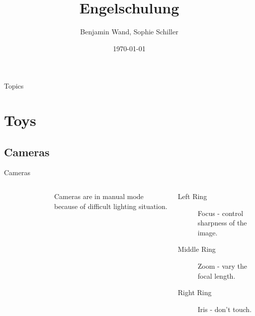 \documentclass[hyperref={pdfpagelabels=false}]{beamer}
\title{Engelschulung}    %
\author{Benjamin Wand, Sophie Schiller}
\date{\today}
\begin{document}
\begin{frame}
\titlepage
\end{frame} 

\begin{frame}{Topics}  %
\tableofcontents
\end{frame} 

\section{Toys}  %
\subsection{Cameras}
\begin{frame}{Cameras}
	\begin{columns}[T,onlytextwidth]
	\begin{figure} 
		\centering
		\def\svgwidth{0.9\textwidth}
		
	\end{figure}
	Cameras are in manual mode because of difficult lighting situation.
	\begin{description}
		\item[Left Ring] Focus - control sharpness of the image.
		\item[Middle Ring] Zoom - vary the focal length.
		\item[Right Ring] Iris - don't touch.
     \end{description}
\end{columns}
\end{frame}
\end{document}
